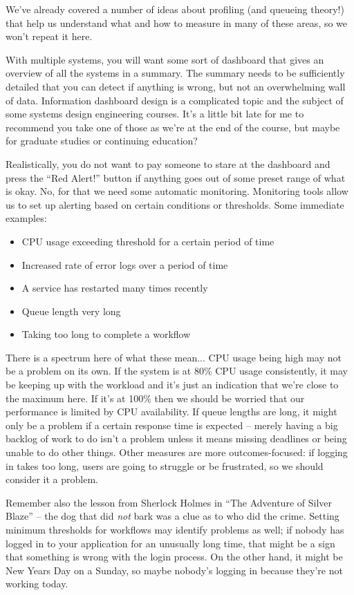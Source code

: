 We've already covered a number of ideas about profiling (and queueing theory!) that help us understand what and how to measure in many of these areas, so we won't repeat it here.

With multiple systems, you will want some sort of dashboard that gives an overview of all the systems in a summary. The summary needs to be sufficiently detailed that you can detect if anything is wrong, but not an overwhelming wall of data. Information dashboard design is a complicated topic and the subject of some systems design engineering courses. It's a little bit late for me to recommend you take one of those as we're at the end of the course, but maybe for graduate studies or continuing education?

Realistically, you do not want to pay someone to stare at the dashboard and press the  ``Red Alert!'' button if anything goes out of some preset range of what is okay. No, for that we need some automatic monitoring. Monitoring tools allow us to set up alerting based on certain conditions or thresholds. Some immediate examples:
\begin{itemize}
	\item CPU usage exceeding threshold for a certain period of time
	\item Increased rate of error logs over a period of time
	\item A service has restarted many times recently
	\item Queue length very long
	\item Taking too long to complete a workflow
\end{itemize}



There is a spectrum here of what these mean... CPU usage being high may not be a problem on its own. If the system is at 80\% CPU usage consistently, it may be keeping up with the workload and it's just an indication that we're close to the maximum here. If it's at 100\% then we should be worried that our performance is limited by CPU availability. If queue lengths are long, it might only be a problem if a certain response time is expected -- merely having a big backlog of work to do isn't a problem unless it means missing deadlines or being unable to do other things. Other measures are more outcomes-focused: if logging in takes too long, users are going to struggle or be frustrated, so we should consider it a problem.

Remember also the lesson from Sherlock Holmes in ``The Adventure of Silver Blaze'' -- the dog that did \textit{not} bark was a clue as to who did the crime. Setting minimum thresholds for workflows may identify problems as well; if nobody has logged in to your application for an unusually long time, that might be a sign that something is wrong with the login process. On the other hand, it might be New Years Day on a Sunday, so maybe nobody's logging in because they're not working today.

